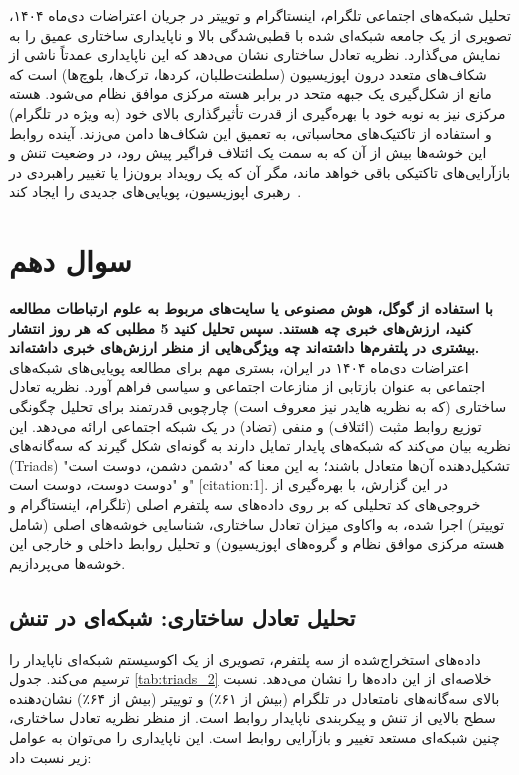 \documentclass{article}
\begin{document}
	تحلیل شبکه‌های اجتماعی تلگرام، اینستاگرام و توییتر در جریان اعتراضات دی‌ماه ۱۴۰۴، تصویری از یک جامعه شبکه‌ای شده با قطبی‌شدگی بالا و ناپایداری ساختاری عمیق را به نمایش می‌گذارد. نظریه تعادل ساختاری نشان می‌دهد که این ناپایداری عمدتاً ناشی از شکاف‌های متعدد درون اپوزیسیون (سلطنت‌طلبان، کردها، ترک‌ها، بلوچ‌ها) است که مانع از شکل‌گیری یک جبهه متحد در برابر هسته مرکزی موافق نظام می‌شود. هسته مرکزی نیز به نوبه خود با بهره‌گیری از قدرت تأثیرگذاری بالای خود (به ویژه در تلگرام) و استفاده از تاکتیک‌های محاسباتی، به تعمیق این شکاف‌ها دامن می‌زند. آینده روابط این خوشه‌ها بیش‌ از آن که به سمت یک ائتلاف فراگیر پیش رود، در وضعیت تنش و بازآرایی‌های تاکتیکی باقی خواهد ماند، مگر آن که یک رویداد برون‌زا یا تغییر راهبردی در رهبری اپوزیسیون، پویایی‌های جدیدی را ایجاد کند~\cite{brin1998pagerank}.


\section{سوال دهم}
\textbf{با استفاده از گوگل، هوش مصنوعی یا سایت‌های مربوط به علوم ارتباطات مطالعه کنید، ارزش‌های خبری چه هستند. سپس تحلیل کنید 5 مطلبی که هر روز انتشار بیشتری در پلتفرم‌ها داشته‌اند چه ویژگی‌هایی از منظر ارزش‌های خبری داشته‌اند.}
\\
	اعتراضات دی‌ماه ۱۴۰۴ در ایران، بستری مهم برای مطالعه پویایی‌های شبکه‌های اجتماعی به عنوان بازتابی از منازعات اجتماعی و سیاسی فراهم آورد. نظریه تعادل ساختاری (که به نظریه هایدر نیز معروف است) چارچوبی قدرتمند برای تحلیل چگونگی توزیع روابط مثبت (ائتلاف) و منفی (تضاد) در یک شبکه اجتماعی ارائه می‌دهد. این نظریه بیان می‌کند که شبکه‌های پایدار تمایل دارند به گونه‌ای شکل گیرند که سه‌گانه‌های (Triads) تشکیل‌دهنده آن‌ها متعادل باشند؛ به این معنا که "دشمن دشمن، دوست است" و "دوست دوست، دوست است" [citation:1]. در این گزارش، با بهره‌گیری از خروجی‌های کد تحلیلی که بر روی داده‌های سه پلتفرم اصلی (تلگرام، اینستاگرام و توییتر) اجرا شده، به واکاوی میزان تعادل ساختاری، شناسایی خوشه‌های اصلی (شامل هسته مرکزی موافق نظام و گروه‌های اپوزیسیون) و تحلیل روابط داخلی و خارجی این خوشه‌ها می‌پردازیم.
	\\
	\subsection{تحلیل تعادل ساختاری: شبکه‌ای در تنش}
	داده‌های استخراج‌شده از سه پلتفرم، تصویری از یک اکوسیستم شبکه‌ای ناپایدار را ترسیم می‌کند. جدول \ref{tab:triads_2} خلاصه‌ای از این داده‌ها را نشان می‌دهد.
	نسبت بالای سه‌گانه‌های نامتعادل در تلگرام (بیش از ۶۱٪) و توییتر (بیش از ۶۴٪) نشان‌دهنده سطح بالایی از تنش و پیکربندی ناپایدار روابط است. از منظر نظریه تعادل ساختاری، چنین شبکه‌ای مستعد تغییر و بازآرایی روابط است. این ناپایداری را می‌توان به عوامل زیر نسبت داد:
	
\end{document}
